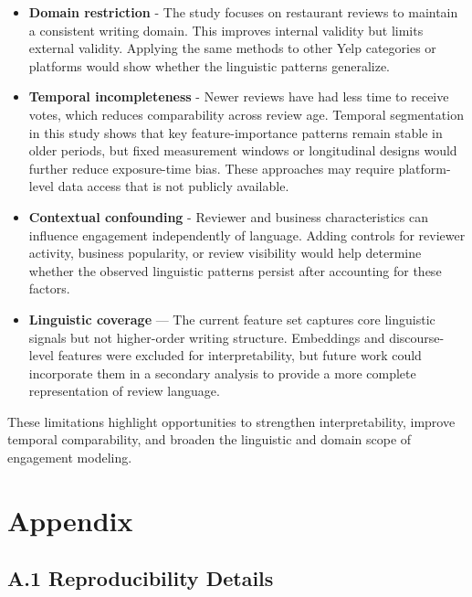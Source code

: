\documentclass[12pt]{article}
\begin{document}
\begin{itemize}

\item \textbf{Domain restriction} -  The study focuses on restaurant reviews to maintain a consistent writing domain. This improves internal validity but limits external validity. Applying the same methods to other Yelp categories or platforms would show whether the linguistic patterns generalize.

\item \textbf{Temporal incompleteness} - Newer reviews have had less time to receive votes, which reduces comparability across review age. Temporal segmentation in this study shows that key feature-importance patterns remain stable in older periods, but fixed measurement windows or longitudinal designs would further reduce exposure-time bias. These approaches may require platform-level data access that is not publicly available.

\item \textbf{Contextual confounding} -  Reviewer and business characteristics can influence engagement independently of language. Adding controls for reviewer activity, business popularity, or review visibility would help determine whether the observed linguistic patterns persist after accounting for these factors.

\item \textbf{Linguistic coverage} —  The current feature set captures core linguistic signals but not higher-order writing structure. Embeddings and discourse-level features were excluded for interpretability, but future work could incorporate them in a secondary analysis to provide a more complete representation of review language.

\end{itemize}

These limitations highlight opportunities to strengthen interpretability, improve temporal comparability, and broaden the linguistic and domain scope of engagement modeling.





\section*{Appendix}

\subsection*{A.1 Reproducibility Details}
\end{document}
